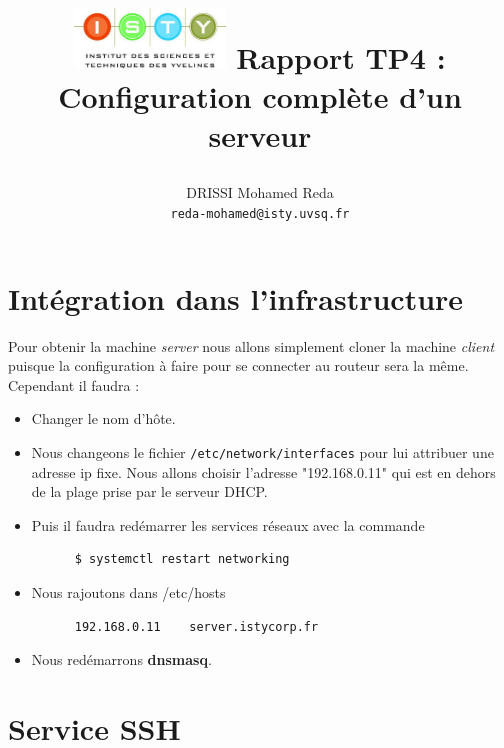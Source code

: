 \documentclass{report}
\begin{document}
\title{
  \begin{minipage}\linewidth
      \centering
      \includegraphics[width=40mm]{resources/01.png}\vskip 20pt
      Rapport TP4 : Configuration complète d'un serveur
      \vskip 5pt
      \author{
        DRISSI Mohamed Reda \\
        \texttt{reda-mohamed@isty.uvsq.fr}
      }
    \end{minipage}
}
\maketitle
\newpage
\tableofcontents
\newpage
\section{Intégration dans l'infrastructure}
Pour obtenir la machine \textit{server} nous allons simplement cloner la machine \textit{client}
puisque la configuration à faire pour se connecter au routeur sera la même.\\
Cependant il faudra :
\begin{itemize}
  \item Changer le nom d'hôte.
  \item Nous changeons le fichier \texttt{/etc/network/interfaces} pour lui attribuer une adresse ip fixe. Nous
    allons choisir l'adresse "192.168.0.11" qui est en dehors de la plage prise par le serveur DHCP.
  \item Puis il faudra redémarrer les services réseaux avec la commande
  \begin{tcolorbox}
    \begin{verbatim}
      $ systemctl restart networking
    \end{verbatim}
  \end{tcolorbox}
  \item Nous rajoutons dans /etc/hosts
  \begin{tcolorbox}
    \begin{verbatim}
      192.168.0.11    server.istycorp.fr
    \end{verbatim}
  \end{tcolorbox}
  \item Nous redémarrons \textbf{dnsmasq}.
\end{itemize}
\section{Service SSH}
\end{document}

